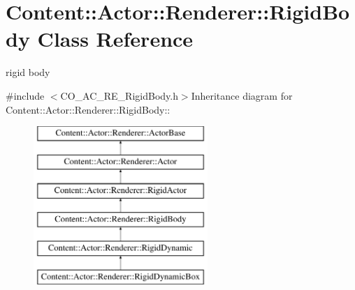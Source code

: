 \hypertarget{classContent_1_1Actor_1_1Renderer_1_1RigidBody}{
\section{Content::Actor::Renderer::RigidBody Class Reference}
\label{classContent_1_1Actor_1_1Renderer_1_1RigidBody}
}


rigid body  


{\ttfamily \#include $<$CO\_\-AC\_\-RE\_\-RigidBody.h$>$}Inheritance diagram for Content::Actor::Renderer::RigidBody::\begin{figure}[H]
\begin{center}
\leavevmode
\includegraphics[height=6cm]{classContent_1_1Actor_1_1Renderer_1_1RigidBody}
\end{center}
\end{figure}
